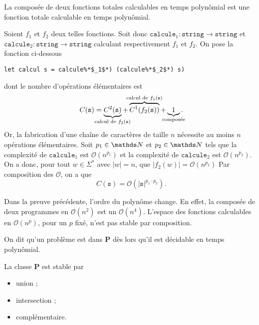 \begin{prop}
	La composée de deux fonctions totales calculables en temps polynômial est une fonction totale calculable en temps polynômial.
\end{prop}

\begin{prv}
	Soient $f_1$\/ et $f_2$\/ deux telles fonctions. Soit donc $\texttt{calcule}_1 : \texttt{string} \to \texttt{string}$\/ et $\texttt{calcule}_2 : \texttt{string}\to \texttt{string}$\/ calculant respectivement $f_1$\/ et $f_2$. On pose la fonction ci-dessous
	\begin{lstlisting}[language=caml,caption=Machine calculant la composée en temps polynômial]
let calcul s = calcule%*$_1$*) (calcule%*$_2$*) s)
	\end{lstlisting}
	dont le nombre d'opérations élémentaires est \[
		C({\texttt{s}}) = \underbrace{C^2(\texttt{s})}_{\text{\clap{calcul de $f_2(\texttt{s})$}}} + \overbrace{C^1(f_2(\texttt{s}))}^{\text{\clap{calcul de $f_1(\texttt{s})$}}} + \underbrace{1}_{\text{\clap{composée}}}
	.\]
	Or, la fabrication d'une chaîne de caractères de taille $n$\/ nécessite au moins $n$\/ opérations élémentaires. Soit $p_1 \in \N$\/ et $p_2 \in \N$\/ tels que la complexité de $\texttt{calcule}_1$\/ est $\mathcal{O}(n^{p_1})$\/ et la complexité de $\texttt{calcule}_2$\/ est $\mathcal{O}(n^{p_2})$. On a donc, pour tout $w \in \Sigma^*$\/ avec $|w| = n$, que $|f_2(w)| = \mathcal{O}(n^{p_2})$
	Par composition des $\mathcal{O}$, on a que \[
		C(\texttt{s}) = \mathcal{O}(|\texttt{s}|^{p_1\cdot p_2})
	.\] 
\end{prv}

\begin{rmk}
	Dans la preuve précédente, l'ordre du polynôme change. En effet, la composée de deux programmes en $\mathcal{O}(n^2)$\/ est un $\mathcal{O}(n^4)$. L'espace des fonctions calculables en $\mathcal{O}(n^p)$, pour un $p$\/ fixé, n'est pas stable par composition.
\end{rmk}

\begin{defn}
	On dit qu'un problème est dans \textbf{P} dès lors qu'il est décidable en temps polynômial.
\end{defn}

\begin{prop}
	La classe \textbf{P} est stable par
	\vspace{-2\baselineskip}
	\begin{multicols}{3}
		\begin{itemize}
			\item union ;
			\item intersection ;
			\item complémentaire.
		\end{itemize}
	\end{multicols}
\end{prop}

